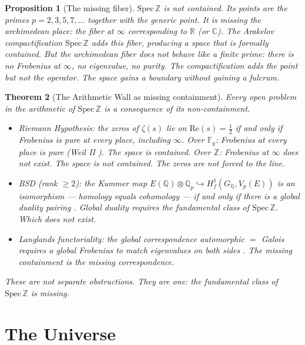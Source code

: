 \documentclass[12pt]{article}
\newtheorem{theorem}{Theorem}
\newtheorem{proposition}[theorem]{Proposition}
\theoremstyle{definition}
\theoremstyle{remark}
\begin{document}
\begin{proposition}[The missing fiber]
$\mathrm{Spec}\,\mathbb{Z}$ is not contained.
Its points are the primes $p = 2, 3, 5, 7, \ldots$
together with the generic point.
It is missing the archimedean place: the fiber at $\infty$
corresponding to $\mathbb{R}$ (or $\mathbb{C}$).
The Arakelov compactification $\overline{\mathrm{Spec}\,\mathbb{Z}}$
adds this fiber, producing a space that is \emph{formally} contained.
But the archimedean fiber does not behave like a finite prime:
there is no Frobenius at $\infty$, no eigenvalue, no purity.
The compactification adds the point but not the operator.
The space gains a boundary without gaining a fulcrum.
\end{proposition}

\begin{theorem}[The Arithmetic Wall as missing containment]
\label{thm:wall}
Every open problem in the arithmetic of $\mathrm{Spec}\,\mathbb{Z}$
is a consequence of its non-containment.
\begin{itemize}
\item \emph{Riemann Hypothesis}: the zeros of $\zeta(s)$
  lie on $\mathrm{Re}(s) = \tfrac{1}{2}$ if and only if
  Frobenius is pure at every place, including $\infty$.
  Over $\mathbb{F}_q$: Frobenius at every place is pure
  (Weil II \cite{weil}). The space is contained.
  Over $\mathbb{Z}$: Frobenius at $\infty$ does not exist.
  The space is not contained. The zeros are not forced to the line.
\item \emph{BSD (rank $\geq 2$)}: the Kummer map
  $E(\mathbb{Q}) \otimes \mathbb{Q}_p
  \hookrightarrow H^1_f(G_\mathbb{Q}, V_p(E))$
  is an isomorphism --- homology equals cohomology --- if and only if
  there is a global duality pairing \cite{homology}.
  Global duality requires the fundamental class of $\mathrm{Spec}\,\mathbb{Z}$.
  Which does not exist.
\item \emph{Langlands functoriality}: the global correspondence
  automorphic $=$ Galois requires a global Frobenius
  to match eigenvalues on both sides \cite{langlands}.
  The missing containment is the missing correspondence.
\end{itemize}
These are not separate obstructions. They are one:
the fundamental class of $\mathrm{Spec}\,\mathbb{Z}$ is missing.
\end{theorem}

\section{The Universe}
\end{document}
